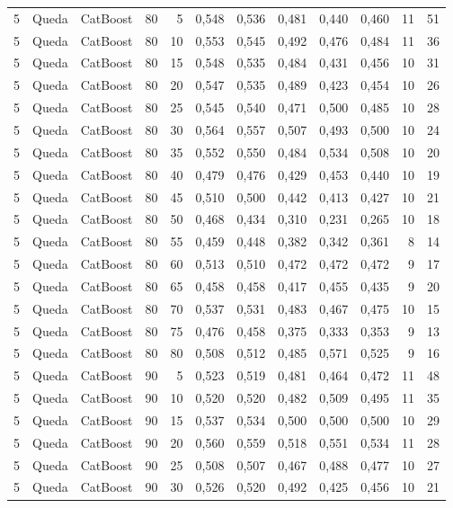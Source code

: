 \begin{longtable}{@{}rllrrrrrrrrr@{}}
5 & Queda & CatBoost & 80 & 5 & 0,548 & 0,536 & 0,481 & 0,440 & 0,460 & 11 & 51 \\
5 & Queda & CatBoost & 80 & 10 & 0,553 & 0,545 & 0,492 & 0,476 & 0,484 & 11 & 36 \\
5 & Queda & CatBoost & 80 & 15 & 0,548 & 0,535 & 0,484 & 0,431 & 0,456 & 10 & 31 \\
5 & Queda & CatBoost & 80 & 20 & 0,547 & 0,535 & 0,489 & 0,423 & 0,454 & 10 & 26 \\
5 & Queda & CatBoost & 80 & 25 & 0,545 & 0,540 & 0,471 & 0,500 & 0,485 & 10 & 28 \\
5 & Queda & CatBoost & 80 & 30 & 0,564 & 0,557 & 0,507 & 0,493 & 0,500 & 10 & 24 \\
5 & Queda & CatBoost & 80 & 35 & 0,552 & 0,550 & 0,484 & 0,534 & 0,508 & 10 & 20 \\
5 & Queda & CatBoost & 80 & 40 & 0,479 & 0,476 & 0,429 & 0,453 & 0,440 & 10 & 19 \\
5 & Queda & CatBoost & 80 & 45 & 0,510 & 0,500 & 0,442 & 0,413 & 0,427 & 10 & 21 \\
5 & Queda & CatBoost & 80 & 50 & 0,468 & 0,434 & 0,310 & 0,231 & 0,265 & 10 & 18 \\
5 & Queda & CatBoost & 80 & 55 & 0,459 & 0,448 & 0,382 & 0,342 & 0,361 & 8 & 14 \\
5 & Queda & CatBoost & 80 & 60 & 0,513 & 0,510 & 0,472 & 0,472 & 0,472 & 9 & 17 \\
5 & Queda & CatBoost & 80 & 65 & 0,458 & 0,458 & 0,417 & 0,455 & 0,435 & 9 & 20 \\
5 & Queda & CatBoost & 80 & 70 & 0,537 & 0,531 & 0,483 & 0,467 & 0,475 & 10 & 15 \\
5 & Queda & CatBoost & 80 & 75 & 0,476 & 0,458 & 0,375 & 0,333 & 0,353 & 9 & 13 \\
5 & Queda & CatBoost & 80 & 80 & 0,508 & 0,512 & 0,485 & 0,571 & 0,525 & 9 & 16 \\
5 & Queda & CatBoost & 90 & 5 & 0,523 & 0,519 & 0,481 & 0,464 & 0,472 & 11 & 48 \\
5 & Queda & CatBoost & 90 & 10 & 0,520 & 0,520 & 0,482 & 0,509 & 0,495 & 11 & 35 \\
5 & Queda & CatBoost & 90 & 15 & 0,537 & 0,534 & 0,500 & 0,500 & 0,500 & 10 & 29 \\
5 & Queda & CatBoost & 90 & 20 & 0,560 & 0,559 & 0,518 & 0,551 & 0,534 & 11 & 28 \\
5 & Queda & CatBoost & 90 & 25 & 0,508 & 0,507 & 0,467 & 0,488 & 0,477 & 10 & 27 \\
5 & Queda & CatBoost & 90 & 30 & 0,526 & 0,520 & 0,492 & 0,425 & 0,456 & 10 & 21 \\

\end{longtable}
